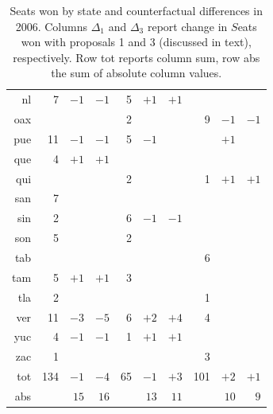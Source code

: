 \documentclass[letter,12pt]{article}
\begin{document}
\begin{table}
\begin{center}
\begin{tabular}{rrrr|rrr|rrr}
 nl &   7 & $-1$& $-1$&    5 &  $+1$&  $+1$&      &      &        \\       
oax &     &     &     &    2 &      &      &    9 &  $-1$&  $-1$  \\       \hdashline
pue &  11 & $-1$& $-1$&    5 &  $-1$&      &      &  $+1$&        \\       
que &   4 & $+1$& $+1$&      &      &      &      &      &        \\       
qui &     &     &     &    2 &      &      &    1 &  $+1$&  $+1$  \\       
san &   7 &     &     &      &      &      &      &      &        \\       \hdashline
sin &   2 &     &     &    6 &  $-1$&  $-1$&      &      &        \\       
son &   5 &     &     &    2 &      &      &      &      &        \\       
tab &     &     &     &      &      &      &    6 &      &        \\       
tam &   5 & $+1$& $+1$&    3 &      &      &      &      &        \\       \hdashline
tla &   2 &     &     &      &      &      &    1 &      &        \\       
ver &  11 & $-3$& $-5$&    6 &  $+2$&  $+4$&    4 &      &        \\       
yuc &   4 & $-1$& $-1$&    1 &  $+1$&  $+1$&      &      &        \\       
zac &   1 &     &     &      &      &      &    3 &      &        \\ \hline 
tot & 134 & $-1$& $-4$&   65 &  $-1$&  $+3$&  101 &  $+2$&  $+1$  \\       
abs &     & $15$& $16$&      &  $13$&  $11$&      &  $10$&  $9$  \\       
\end{tabular}
\caption{Seats won by state and counterfactual differences in 2006. Columns $\Delta_1$ and $\Delta_3$ report change in $S$eats won with proposals 1 and 3 (discussed in text), respectively. Row tot reports column sum, row abs the sum of absolute column values.}\label{T:2006}
\end{center}
\end{table}
\end{document}
